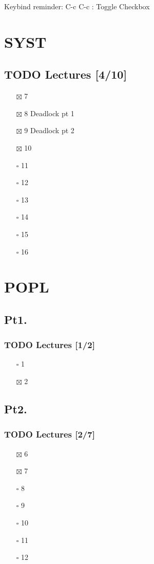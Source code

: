 \documentclass[11pt]{article}
\date{\today}
\title{}
\begin{document}
\tableofcontents

Keybind reminder:
C-c C-c : Toggle Checkbox
\section{SYST}
\label{sec:orgbee63b0}
\subsection{{\bfseries\sffamily TODO} Lectures [4/10]}
\label{sec:org12bf113}
\begin{itemize}
\item[{$\boxtimes$}] 7
\item[{$\boxtimes$}] 8 Deadlock pt 1
\item[{$\boxtimes$}] 9 Deadlock pt 2
\item[{$\boxtimes$}] 10
\item[{$\square$}] 11
\item[{$\square$}] 12
\item[{$\square$}] 13
\item[{$\square$}] 14
\item[{$\square$}] 15
\item[{$\square$}] 16
\end{itemize}
\section{POPL}
\label{sec:org00b2e29}
\subsection{Pt1.}
\label{sec:org91971f5}
\subsubsection{{\bfseries\sffamily TODO} Lectures [1/2]}
\label{sec:org1c6408f}
\begin{itemize}
\item[{$\square$}] 1
\item[{$\boxtimes$}] 2
\end{itemize}
\subsection{Pt2.}
\label{sec:org64b2f85}
\subsubsection{{\bfseries\sffamily TODO} Lectures [2/7]}
\label{sec:orga07784b}
\begin{itemize}
\item[{$\boxtimes$}] 6
\item[{$\boxtimes$}] 7
\item[{$\square$}] 8
\item[{$\square$}] 9
\item[{$\square$}] 10
\item[{$\square$}] 11
\item[{$\square$}] 12
\end{itemize}
\end{document}
